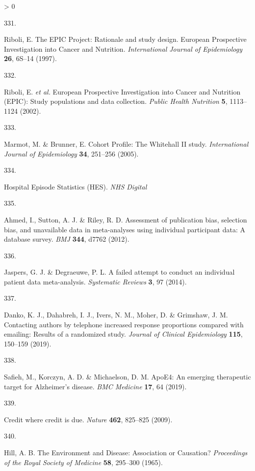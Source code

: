 \documentclass[a4paper, twoside]{templates/ociamthesis}
\newlength{\cslhangindent}
\newlength{\csllabelwidth}
\newenvironment{CSLReferences}[3] %
 {%
  \setlength{\parindent}{0pt}
  \ifodd #1 \everypar{\setlength{\hangindent}{\cslhangindent}}\ignorespaces\fi
  \ifnum #2 > 0
  \setlength{\parskip}{#2\baselineskip}
  \fi
 }%
 {}
\newcommand{\CSLLeftMargin}[1]{\parbox[t]{\maxof{\widthof{#1}}{\csllabelwidth}}{#1}}
\newcommand{\CSLRightInline}[1]{\parbox[t]{\linewidth - \csllabelwidth}{#1}}
\begin{document}
\begin{CSLReferences}{0}{0}
\leavevmode\hypertarget{ref-riboli1997}{}%
\CSLLeftMargin{331. }
\CSLRightInline{Riboli, E. The {EPIC Project}: Rationale and study design. {European Prospective Investigation} into {Cancer} and {Nutrition}. \emph{International Journal of Epidemiology} \textbf{26}, 6S--14 (1997).}

\leavevmode\hypertarget{ref-riboli2002}{}%
\CSLLeftMargin{332. }
\CSLRightInline{Riboli, E. \emph{et al.} European {Prospective Investigation} into {Cancer} and {Nutrition} ({EPIC}): Study populations and data collection. \emph{Public Health Nutrition} \textbf{5}, 1113--1124 (2002).}

\leavevmode\hypertarget{ref-marmot2005}{}%
\CSLLeftMargin{333. }
\CSLRightInline{Marmot, M. \& Brunner, E. Cohort {Profile}: The {Whitehall II} study. \emph{International Journal of Epidemiology} \textbf{34}, 251--256 (2005).}

\leavevmode\hypertarget{ref-zotero-15403}{}%
\CSLLeftMargin{334. }
\CSLRightInline{Hospital {Episode Statistics} ({HES}). \emph{NHS Digital}}

\leavevmode\hypertarget{ref-ahmed2012}{}%
\CSLLeftMargin{335. }
\CSLRightInline{Ahmed, I., Sutton, A. J. \& Riley, R. D. Assessment of publication bias, selection bias, and unavailable data in meta-analyses using individual participant data: A database survey. \emph{BMJ} \textbf{344}, d7762 (2012).}

\leavevmode\hypertarget{ref-jaspers2014}{}%
\CSLLeftMargin{336. }
\CSLRightInline{Jaspers, G. J. \& Degraeuwe, P. L. A failed attempt to conduct an individual patient data meta-analysis. \emph{Systematic Reviews} \textbf{3}, 97 (2014).}

\leavevmode\hypertarget{ref-danko2019}{}%
\CSLLeftMargin{337. }
\CSLRightInline{Danko, K. J., Dahabreh, I. J., Ivers, N. M., Moher, D. \& Grimshaw, J. M. Contacting authors by telephone increased response proportions compared with emailing: Results of a randomized study. \emph{Journal of Clinical Epidemiology} \textbf{115}, 150--159 (2019).}

\leavevmode\hypertarget{ref-safieh2019}{}%
\CSLLeftMargin{338. }
\CSLRightInline{Safieh, M., Korczyn, A. D. \& Michaelson, D. M. {ApoE4}: An emerging therapeutic target for {Alzheimer}'s disease. \emph{BMC Medicine} \textbf{17}, 64 (2019).}

\leavevmode\hypertarget{ref-nature2009}{}%
\CSLLeftMargin{339. }
\CSLRightInline{Credit where credit is due. \emph{Nature} \textbf{462}, 825--825 (2009).}

\leavevmode\hypertarget{ref-hill1965}{}%
\CSLLeftMargin{340. }
\CSLRightInline{Hill, A. B. The {Environment} and {Disease}: Association or {Causation}? \emph{Proceedings of the Royal Society of Medicine} \textbf{58}, 295--300 (1965).}


\end{CSLReferences}
\end{document}
